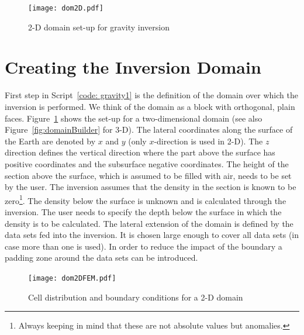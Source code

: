 \begin{figure}
\centering
\texttt{[image: dom2D.pdf]}
\caption{2-D domain set-up for gravity inversion}
\label{FIG:P1:GRAV:2}
\end{figure}

\section{Creating the Inversion Domain}
First step in Script~\ref{code: gravity1} is the definition of the domain over
which the inversion is performed.
We think of the domain as a block with orthogonal, plain faces.
Figure~\ref{FIG:P1:GRAV:2} shows the set-up for a two-dimensional domain
(see also Figure~\ref{fig:domainBuilder} for 3-D).
The lateral coordinates along the surface of the Earth are denoted by $x$ and
$y$ (only $x$-direction is used in 2-D).
The $z$ direction defines the vertical direction where the part above the
surface has positive coordinates and the subsurface negative coordinates.
The height of the section above the surface, which is assumed to be filled
with air, needs to be set by the user.
The inversion assumes that the density in the section is known to be
zero\footnote{Always keeping in mind that these are not absolute values but
anomalies.}.
The density below the surface is unknown and is calculated through the
inversion. The user needs to specify the depth below the surface in which the
density is to be calculated.
The lateral extension of the domain is defined by the data sets fed into the
inversion.
It is chosen large enough to cover all data sets (in case more than one is
used). In order to reduce the impact of the boundary a padding zone around the
data sets can be introduced.

\begin{figure}
\centering
\texttt{[image: dom2DFEM.pdf]}
\caption{Cell distribution and boundary conditions for a 2-D domain}
\label{FIG:P1:GRAV:3}
\end{figure}

